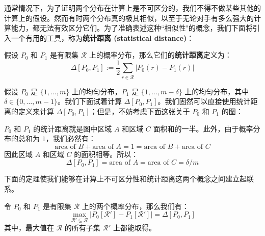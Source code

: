 通常情况下，为了证明两个分布在计算上是不可区分的，我们不得不做某些其他的计算上的假设。然而有时两个分布真的极其相似，以至于无论对手有多么强大的计算能力，都无法有效区分它们。为了准确表述这种``相似性"的概念，我们下面将引入一个有用的工具，称为\textbf{统计距离 (statistical distance)}：

\begin{definition}[统计距离]\label{def:3-5}
假设 $P_0$ 和 $P_1$ 是有限集 $\mathcal R$ 上的概率分布，那么它们的\textbf{统计距离}定义为：
\[
\Delta[P_0,P_1]:=\frac{1}{2}\sum_{r\in\mathcal{R}}\big\lvert P_0(r)-P_1(r)\big\rvert
\]
\end{definition}

\begin{example}\label{exmp:3-1}
假设 $P_0$ 是 $\{1,\dots,m\}$ 上的均匀分布，$P_1$ 是 $\{1,\dots,m-\delta\}$ 上的均匀分布，其中 $\delta\in\{0,\dots,m-1\}$。我们下面试着计算 $\Delta[P_0,P_1]$。我们固然可以直接使用统计距离的定义来计算 $\Delta[P_0,P_1]$；但是，不妨考虑下面这张关于 $P_0$ 和 $P_1$ 的图：

\begin{figure*}[h!]
  \centering
  
\end{figure*}

$P_0$ 和 $P_1$ 的统计距离就是图中区域 $A$ 和区域 $C$ 面积和的一半。此外，由于概率分布的总和为 $1$，我们必然有：
\[
\text{area of } B+ \text{area of } A= 1 = \text{area of } B+ \text{area of } C
\]
因此区域 $A$ 和区域 $C$ 的面积相等。所以：
\[
\Delta[P_0,P_1]=\text{area of } A = \text{area of } C ={\delta}/{m}
\]
\end{example}

下面的定理使我们能够在计算上不可区分性和统计距离这两个概念之间建立起联系。

\begin{theorem}\label{theo:3-10}
令 $P_0$ 和 $P_1$ 是有限集 $\mathcal R$ 上的两个概率分布，那么我们有：
\[
\max_{\mathcal{R}'\subseteq\mathcal{R}}|P_0[\mathcal{R}']-P_1[\mathcal{R}']|=\Delta[P_0,P_1]
\]
其中，最大值在 $\mathcal R$ 的所有子集 $\mathcal R'$ 上都能取得。
\end{theorem}

